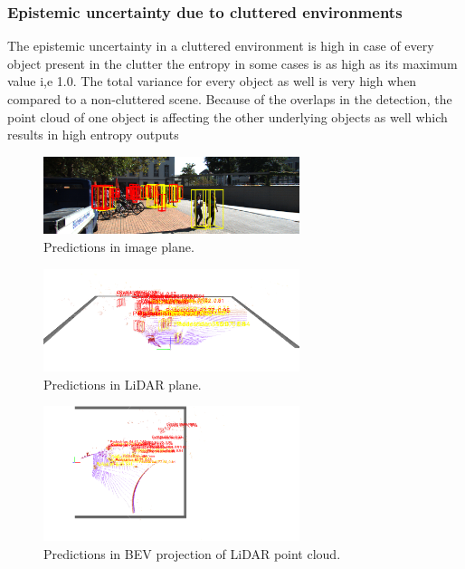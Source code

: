 \documentclass[10pt,twocolumn,letterpaper]{article}
\begin{document}
\subsubsection{Epistemic uncertainty due to cluttered environments}
The epistemic uncertainty in a cluttered environment is high in case of every object present in the clutter the entropy in some cases is as high as its maximum value i,e 1.0. The total variance for every object as well is very high when compared to a non-cluttered scene. Because of the overlaps in the detection, the point cloud of one object is affecting the other underlying objects as well which results in high entropy outputs
\begin{figure}[!htbp]
        \centering
		\includegraphics[width=75mm, scale = 0.4]{images/Uncertainty_results/5226_cluttered_bbox.png}
        \caption[Extracted frustum point cloud after Normalization]{Predictions in image plane.}
        \label{fig:Uncert_blockage-1}
\end{figure}
\begin{figure}[!htbp]
        \centering
		\includegraphics[width=75mm, scale = 0.4]{images/Uncertainty_results/5226_Follow_cam_view.png}
        \caption[Extracted frustum point cloud after Normalization]{Predictions in LiDAR plane.}
        \label{fig:Uncert_blockage-1}
\end{figure}
\begin{figure}[!htbp]
        \centering
		\includegraphics[width=75mm,scale = 0.4]{images/Uncertainty_results/5226_cluttered.png}
        \caption[Extracted frustum point cloud after Normalization]{Predictions in BEV projection of LiDAR point cloud.}
        \label{fig:Uncert_blockage-1}
\end{figure}
\end{document}

